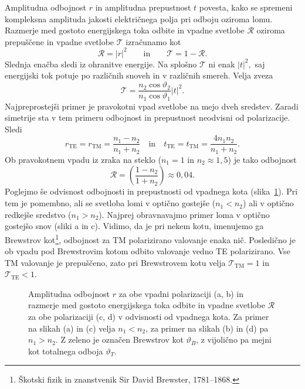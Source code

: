 Amplitudna odbojnost $r$ in amplitudna prepustnost $t$ povesta, kako se spremeni 
kompleksna amplituda jakosti električnega polja pri odboju oziroma lomu.
Razmerje med gostoto energijskega toka odbite in vpadne svetlobe $\mathcal{R}$ oziroma 
prepuščene in vpadne svetlobe $\mathcal{T}$ izračunamo kot 
\begin{equation}
\mathcal{R}=\left|r\right|^{2} \qquad \mathrm{in} \qquad \mathcal{T}=1-\mathcal{R}.
\end{equation}
Slednja enačba sledi iz ohranitve energije. Na splošno $\mathcal{T}$
ni enak $\left|t\right|^{2},$ saj energijski tok potuje po različnih
snoveh in v različnih smereh. Velja zveza
\begin{equation}
\mathcal{T}=\frac{n_{2}\cos\vartheta_{2}}{n_{1}\cos\vartheta_{1}}\left|t\right|^{2}.
\end{equation}
Najpreprostejši primer je pravokotni vpad svetlobe na mejo dveh sredstev. Zaradi simetrije 
sta v tem primeru odbojnost in prepustnost neodvisni od polarizacije. Sledi 
\begin{equation}
r_{\mathrm{TE}} = r_{\mathrm{TM}} = \frac{n_1-n_2}{n_1+n_2}
\quad \mathrm{in} \quad 
t_{\mathrm{TE}} = t_{\mathrm{TM}} = \frac{4n_1n_2}{n_1+n_2}. 
\end{equation}
Ob pravokotnem vpadu iz zraka na steklo ($n_1 = 1$ in $n_2 \approx 1,5$) je tako odbojnost 
\begin{equation}
\mathcal{R} = \left(\frac{1-n_2}{1+n_2}\right) \approx 0,04.
\end{equation}
Poglejmo še odvisnost odbojnosti in prepustnosti od vpadnega kota (slika~\ref{fig:Brewster}). 
Pri tem je pomembno, ali se svetloba lomi v optično gostejše ($n_1<n_2$) ali v optično
redkejše sredstvo ($n_1>n_2$). Najprej obravnavajmo primer loma v optično gostejšo snov 
(sliki a in c). Vidimo, da je pri nekem kotu, imenujemo ga Brewstrov 
kot\footnote{Škotski fizik in znanstvenik Sir David Brewster, 1781--1868.}, odbojnost 
za TM polarizirano valovanje enaka nič. Posledično je ob vpadu pod Brewstrovim kotom 
odbito valovanje vedno TE polarizirano. Vse TM valovanje je prepuščeno, zato 
pri Brewstrovem kotu velja $\mathcal{T}_\mathrm{TM}=1$ in $\mathcal{T}_\mathrm{TE}<1$.
\begin{figure}[h]
\centering
  \def\svgwidth{140truemm} 
  
\caption{Amplitudna odbojnost $r$ za obe vpadni polarizaciji (a, b) in razmerje med 
gostoto energijskega toka odbite in vpadne svetlobe $\mathcal{R}$ za obe polarizaciji (c, d)
v odvisnosti od vpadnega kota. Za primer na slikah (a) in (c) velja $n_1<n_2$, za primer na 
slikah (b) in (d) pa $n_1>n_2$. Z zeleno je označen Brewstrov kot $\vartheta_B$, 
z vijolično pa mejni kot totalnega odboja $\vartheta_T$.}
\label{fig:Brewster}
\end{figure}

